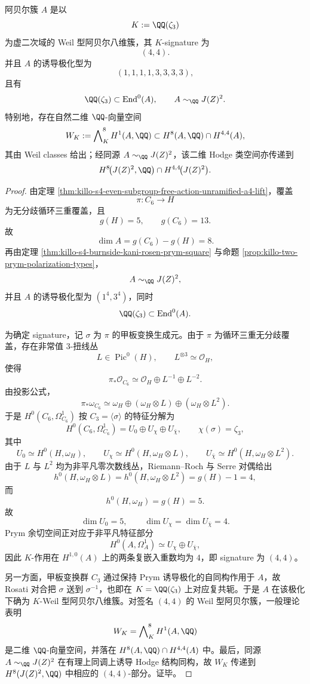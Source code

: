 \begin{conclusion}\label{con:xi-time-part9n-prym-c6h-weil-type-signature}
阿贝尔簇 \(A\) 是以
\[
K:=\QQ(\zeta_3)
\]
为虚二次域的 Weil 型阿贝尔八维簇，其 \(K\)-signature 为
\[
(4,4).
\]
并且 \(A\) 的诱导极化型为
\[
(1,1,1,1,3,3,3,3),
\]
且有
\[
\QQ(\zeta_3)\subset \operatorname{End}^0(A),\qquad
A\sim_{\QQ}J(Z)^2.
\]
特别地，存在自然二维 \(\QQ\)-向量空间
\[
W_K:=\bigwedge\nolimits_{K}^{8}H^1(A,\QQ)\subset H^8(A,\QQ)\cap H^{4,4}(A),
\]
其由 Weil classes 给出；经同源 \(A\sim_{\QQ}J(Z)^2\)，该二维 Hodge 类空间亦传递到
\[
H^8\!\bigl(J(Z)^2,\QQ\bigr)\cap H^{4,4}\!\bigl(J(Z)^2\bigr).
\]
\end{conclusion}
\begin{proof}
由定理 \ref{thm:killo-s4-even-subgroup-free-action-unramified-a4-lift}，覆盖
\[
\pi:C_6\to H
\]
为无分歧循环三重覆盖，且
\[
g(H)=5,\qquad g(C_6)=13.
\]
故
\[
\dim A=g(C_6)-g(H)=8.
\]
再由定理 \ref{thm:killo-s4-burnside-kani-rosen-prym-square} 与命题 \ref{prop:killo-two-prym-polarization-types}，
\[
A\sim_{\QQ}J(Z)^2,
\]
并且 \(A\) 的诱导极化型为 \((1^4,3^4)\)，同时
\[
\QQ(\zeta_3)\subset \operatorname{End}^0(A).
\]

为确定 signature，记 \(\sigma\) 为 \(\pi\) 的甲板变换生成元。由于 \(\pi\) 为循环三重无分歧覆盖，存在非常值 \(3\)-扭线丛
\[
L\in \operatorname{Pic}^0(H),\qquad L^{\otimes 3}\simeq \mathcal O_H,
\]
使得
\[
\pi_*\mathcal O_{C_6}\simeq \mathcal O_H\oplus L^{-1}\oplus L^{-2}.
\]
由投影公式，
\[
\pi_*\omega_{C_6}
\simeq
\omega_H\oplus (\omega_H\otimes L)\oplus (\omega_H\otimes L^2).
\]
于是 \(H^0(C_6,\Omega_{C_6}^1)\) 按 \(C_3=\langle \sigma\rangle\) 的特征分解为
\[
H^0(C_6,\Omega_{C_6}^1)=U_0\oplus U_{\chi}\oplus U_{\bar\chi},
\qquad
\chi(\sigma)=\zeta_3,
\]
其中
\[
U_0\simeq H^0(H,\omega_H),\qquad
U_{\chi}\simeq H^0(H,\omega_H\otimes L),\qquad
U_{\bar\chi}\simeq H^0(H,\omega_H\otimes L^2).
\]
由于 \(L\) 与 \(L^2\) 均为非平凡零次数线丛，Riemann--Roch 与 Serre 对偶给出
\[
h^0(H,\omega_H\otimes L)=h^0(H,\omega_H\otimes L^2)=g(H)-1=4,
\]
而
\[
h^0(H,\omega_H)=g(H)=5.
\]
故
\[
\dim U_0=5,\qquad \dim U_{\chi}=\dim U_{\bar\chi}=4.
\]
Prym 余切空间正对应于非平凡特征部分
\[
H^0(A,\Omega_A^1)\simeq U_{\chi}\oplus U_{\bar\chi},
\]
因此 \(K\)-作用在 \(H^{1,0}(A)\) 上的两条复嵌入重数均为 \(4\)，即 signature 为 \((4,4)\)。

另一方面，甲板变换群 \(C_3\) 通过保持 Prym 诱导极化的自同构作用于 \(A\)，故 Rosati 对合把 \(\sigma\) 送到 \(\sigma^{-1}\)，也即在 \(K=\QQ(\zeta_3)\) 上对应复共轭。于是 \(A\) 在该极化下确为 \(K\)-Weil 型阿贝尔八维簇。对签名 \((4,4)\) 的 Weil 型阿贝尔簇，一般理论表明
\[
W_K=\bigwedge\nolimits_K^{8}H^1(A,\QQ)
\]
是二维 \(\QQ\)-向量空间，并落在 \(H^8(A,\QQ)\cap H^{4,4}(A)\) 中。最后，同源 \(A\sim_{\QQ}J(Z)^2\) 在有理上同调上诱导 Hodge 结构同构，故 \(W_K\) 传递到 \(H^8(J(Z)^2,\QQ)\) 中相应的 \((4,4)\)-部分。证毕。
\end{proof}

